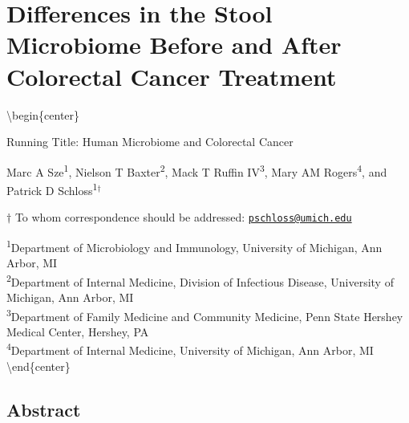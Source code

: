 \documentclass[12pt,]{article}
\title{}
\author{}
\date{}
\begin{document}
\section{Differences in the Stool Microbiome Before and After Colorectal
Cancer
Treatment}\label{differences-in-the-stool-microbiome-before-and-after-colorectal-cancer-treatment}

\textbackslash{}begin\{center\}\\
\vspace{25mm}

Running Title: Human Microbiome and Colorectal Cancer

\vspace{10mm}

Marc A Sze\textsuperscript{1}, Nielson T Baxter\textsuperscript{2}, Mack
T Ruffin IV\textsuperscript{3}, Mary AM Rogers\textsuperscript{4}, and
Patrick D Schloss\textsuperscript{1}\({^\dagger}\)

\vspace{20mm}

\(\dagger\) To whom correspondence should be addressed:
\href{mailto:pschloss@umich.edu}{\nolinkurl{pschloss@umich.edu}}

\textsuperscript{1}Department of Microbiology and Immunology, University
of Michigan, Ann Arbor, MI\\
\textsuperscript{2}Department of Internal Medicine, Division of
Infectious Disease, University of Michigan, Ann Arbor, MI\\
\textsuperscript{3}Department of Family Medicine and Community Medicine,
Penn State Hershey Medical Center, Hershey, PA\\
\textsuperscript{4}Department of Internal Medicine, University of
Michigan, Ann Arbor, MI \textbackslash{}end\{center\}

\newpage

\linenumbers

\subsection{Abstract}\label{abstract}
\end{document}
